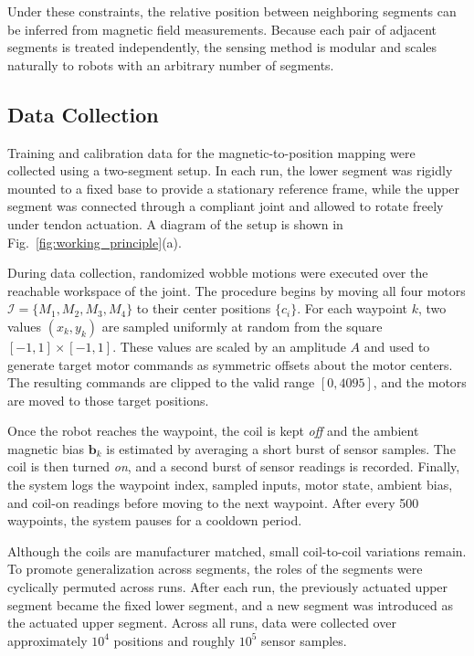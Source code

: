 Under these constraints, the relative position between neighboring segments can be inferred from magnetic field measurements. Because each pair of adjacent segments is treated independently, the sensing method is modular and scales naturally to robots with an arbitrary number of segments.

\subsection{Data Collection}

Training and calibration data for the magnetic-to-position mapping were collected using a two-segment setup. In each run, the lower segment was rigidly mounted to a fixed base to provide a stationary reference frame, while the upper segment was connected through a compliant joint and allowed to rotate freely under tendon actuation. A diagram of the setup is shown in Fig.~\ref{fig:working_principle}(a).

During data collection, randomized wobble motions were executed over the reachable workspace of the joint. The procedure begins by moving all four motors \(\mathcal{I}=\{M_1,M_2,M_3,M_4\}\) to their center positions \(\{c_i\}\). For each waypoint \(k\), two values \((x_k,y_k)\) are sampled uniformly at random from the square \([-1,1]\times[-1,1]\). These values are scaled by an amplitude \(A\) and used to generate target motor commands as symmetric offsets about the motor centers. The resulting commands are clipped to the valid range \([0,4095]\), and the motors are moved to those target positions.

Once the robot reaches the waypoint, the coil is kept \emph{off} and the ambient magnetic bias \(\mathbf{b}_k\) is estimated by averaging a short burst of sensor samples. The coil is then turned \emph{on}, and a second burst of sensor readings is recorded. Finally, the system logs the waypoint index, sampled inputs, motor state, ambient bias, and coil-on readings before moving to the next waypoint. After every 500 waypoints, the system pauses for a cooldown period.

Although the coils are manufacturer matched, small coil-to-coil variations remain. To promote generalization across segments, the roles of the segments were cyclically permuted across runs. After each run, the previously actuated upper segment became the fixed lower segment, and a new segment was introduced as the actuated upper segment. Across all runs, data were collected over approximately \(10^4\) positions and roughly \(10^5\) sensor samples.

